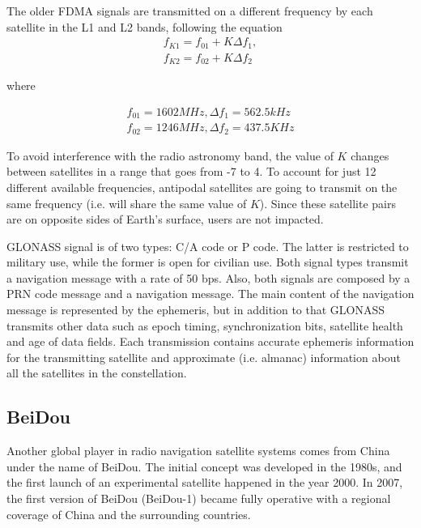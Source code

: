 The older FDMA signals are transmitted on a different frequency by each
satellite in the L1 and L2 bands, following the equation
\begin{equation}
  \begin{array}{l}
    f_{K1} = f_{01} + K \Delta f_1, \\
    f_{K2} = f_{02} + K \Delta f_2
  \end{array}
\end{equation}

where

\begin{equation}
  \begin{array}{l}
    f_{01} = 1602 MHz, \Delta f_1 = 562.5 kHz \\
    f_{02} = 1246 MHz, \Delta f_2 = 437.5 KHz
  \end{array}
\end{equation}

To avoid interference with the radio astronomy band, the value of $K$ changes
between satellites in a range that goes from -7 to 4. To account for just 12
different available frequencies, antipodal satellites are going to transmit on
the same frequency (i.e. will share the same value of $K$). Since these
satellite pairs are on opposite sides of Earth's surface, users are not
impacted.

GLONASS signal is of two types: C/A code or P code. The latter is restricted to
military use, while the former is open for civilian use. Both signal types
transmit a navigation message with a rate of 50 bps. Also, both signals are
composed by a PRN code message and a navigation message. The main content of the
navigation message is represented by the ephemeris, but in addition to that
GLONASS transmits other data such as epoch timing, synchronization bits,
satellite health and age of data fields. Each transmission contains accurate
ephemeris information for the transmitting satellite and approximate (i.e.
almanac) information about all the satellites in the constellation.

\subsection{BeiDou}
Another global player in radio navigation satellite systems comes from China
under the name of BeiDou. The initial concept was developed in the 1980s, and
the first launch of an experimental satellite happened in the year 2000. In
2007, the first version of BeiDou (BeiDou-1) became fully operative with a
regional coverage of China and the surrounding countries.

